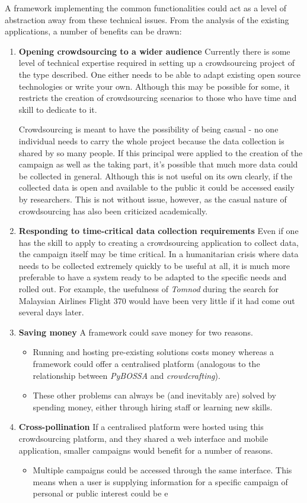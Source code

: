 \documentclass{article}
\newcommand{\pitem}[1]{
	\item{\textbf{#1}}
}
\begin{document}
		A framework implementing the common functionalities could act as a level of abstraction away from these technical issues. From the analysis of the existing applications, a number of benefits can be drawn:

		\begin{enumerate}
			\pitem{Opening crowdsourcing to a wider audience} Currently there is some level of technical expertise required in setting up a crowdsourcing project of the type described. One either needs to be able to adapt existing open source technologies or write your own. Although this may be possible for some, it restricts the creation of crowdsourcing scenarios to those who have time and skill to dedicate to it.

			Crowdsourcing is meant to have the possibility of being casual - no one individual needs to carry the whole project because the data collection is shared by so many people. If this principal were applied to the creation of the campaign as well as the taking part, it's possible that much more data could be collected in general. Although this is not useful on its own clearly, if the collected data is open and available to the public it could be accessed easily by researchers. This is not without issue, however, as the casual nature of crowdsourcing has also been criticized academically\cite{brabham_myth_2012}.
			\pitem{Responding to time-critical data collection requirements} Even if one has the skill to apply to creating a crowdsourcing application to collect data, the campaign itself may be time critical. In a humanitarian crisis where data needs to be collected extremely quickly to be useful at all, it is much more preferable to have a system ready to be adapted to the specific needs and rolled out. For example, the usefulness of \emph{Tomnod} during the search for Malaysian Airlines Flight 370 would have been very little if it had come out several days later.
			\pitem{Saving money} A framework could save money for two reasons.
			\begin{itemize}
				\item Running and hosting pre-existing solutions costs money whereas a framework could offer a centralised platform (analogous to the relationship between \emph{PyBOSSA} and \emph{crowdcrafting}).
				\item These other problems can always be (and inevitably are) solved by spending money, either through hiring staff or learning new skills.
			\end{itemize}
			\pitem{Cross-pollination} If a centralised platform were hosted using this crowdsourcing platform, and they shared a web interface and mobile application, smaller campaigns would benefit for a number of reasons.
			\begin{itemize}
				\item Multiple campaigns could be accessed through the same interface. This means when a user is supplying information for a specific campaign of personal or public interest could be e
			\end{itemize}
		\end{enumerate}
\end{document}
